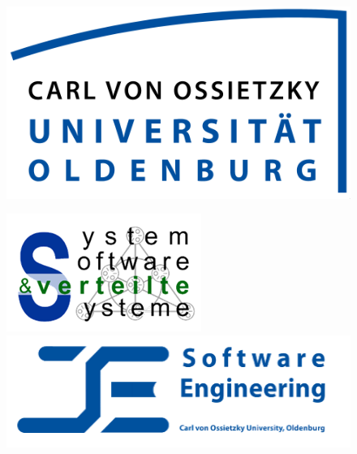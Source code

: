 \thispagestyle{plain}
\begin{titlepage}
\begin{center}


\huge{\ctitle}\\[1.5ex]
\LARGE{\csubtitle}\\[1.5ex]
\LARGE{\cdocname}\\[3ex]
\Large{\cauthor}\\[1.5ex]
\Large{\cdate}\\[4ex]

\begin{figure}[h]
    \centering
    \includegraphics[scale=0.25]{ressourcen/Logo-UOL.png}
    \label{Logo}
\end{figure}

\begin{figure}[h]
	\centering
	\begin{minipage}{0.3\textwidth}
		\includegraphics[scale=0.6]{ressourcen/logo_svs.png}
	\end{minipage}
	\begin{minipage}{0.4\textwidth}
		\includegraphics[scale=0.6]{ressourcen/logo_st.png}
	\end{minipage}
\end{figure}

\end{center}
\end{titlepage}
